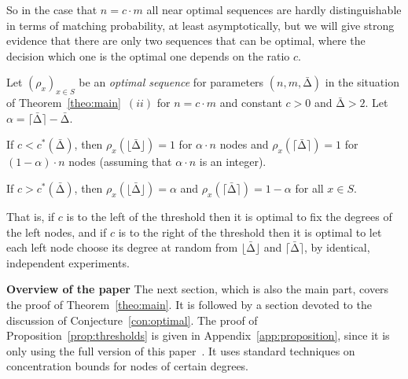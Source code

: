 \let\accentvec\vec \documentclass{llncs}
\newcommand{\keys}{\ensuremath{n}}
\newcommand{\cells}{\ensuremath{m}}
\newcommand{\pmf}{\ensuremath{{\rho}}}
\newcommand{\mean}{{\mathrm{\scriptstyle\Delta}}}
\newcommand{\Amean}{\bar{\mean}}
\newcommand{\floor}[1]{\ensuremath{\lfloor #1\rfloor}}
\newcommand{\ceil}[1]{\ensuremath{\lceil #1\rceil}}
\begin{document}
So in the case that $n=c\cdot m$ all near optimal sequences are hardly distinguishable in terms
of matching probability, at least asymptotically, but we will give strong evidence that there are only two sequences that
can be optimal, where the decision which one is the optimal one depends on the ratio $c$.
\begin{conjecture}
\label{con:optimal}
Let $({\pmf}_x)_{x\in S}$ be an \emph{optimal sequence} for parameters $(\keys,\cells,\Amean)$ 
in the situation of Theorem~\ref{theo:main}~$(ii)$ for $n=c\cdot m$ and constant $c>0$ and 
$\Amean>2$. Let $\alpha=\ceil{\Amean}-\Amean$.
\begin{compactenum}[$(i)$]
\item If  $c<c^*(\Amean)$, then $\pmf_x(\floor{\Amean})=1$ for $\alpha\cdot n$ nodes and $\pmf_x(\ceil{\Amean})=1$ for $(1-\alpha)\cdot n$ nodes 
(assuming that $\alpha\cdot n$ is an integer).
\item If  $c>c^*(\Amean)$, then $\pmf_x(\floor{\Amean})=\alpha$ and $\pmf_x(\ceil{\Amean})=1-\alpha$  for all $x\in S$.
\end{compactenum}
\end{conjecture}
That is, if $c$ is to the left of the threshold then it is optimal to fix the degrees of the left nodes, and
if $c$ is to the right of the threshold then it is optimal to let each left node choose its degree at random
from $\floor{\Amean}$ and $\ceil{\Amean}$, by identical, independent experiments.

\smallskip
\noindent\textbf{Overview of the paper}
The next section, which is also the main part, covers the proof of Theorem~\ref{theo:main}.
It is followed by a section devoted to the discussion of Conjecture~\ref{con:optimal}.
The proof of Proposition~\ref{prop:thresholds} is given in 
\ifnum{}
Appendix~\ref{app:proposition}, since it is only using 
\else
the full version of this paper~\cite[Appendix B]{full_version}. It uses 
\fi
standard techniques on concentration bounds for nodes of certain degrees. 
\end{document}
